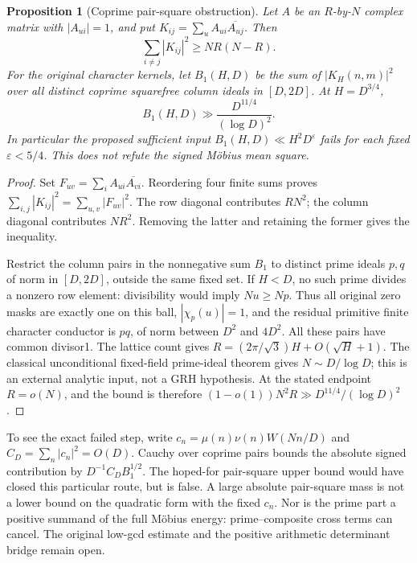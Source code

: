 \documentclass[11pt,oneside,openany]{book}
\newtheorem{proposition}[theorem]{Proposition}
\theoremstyle{definition}\newtheorem{definition}[theorem]{Definition}
\theoremstyle{remark}\newtheorem{remark}[theorem]{Remark}
\begin{document}
\begin{proposition}[Coprime pair-square obstruction]\label{prop:pair-barrier}
Let $A$ be an $R$-by-$N$ complex matrix with $|A_{ui}|=1$, and put
$K_{ij}=\sum_u A_{ui}\overline{A_{uj}}$. Then
\[
 \sum_{i\ne j}|K_{ij}|^2\ge NR(N-R).
\]
For the original character kernels, let $B_1(H,D)$ be the sum of
$|K_H(n,m)|^2$ over all distinct coprime squarefree column ideals in
$[D,2D]$. At $H=D^{3/4}$,
\[
 B_1(H,D)\gg \frac{D^{11/4}}{(\log D)^2}.
\]
In particular the proposed sufficient input
$B_1(H,D)\ll H^2D^\varepsilon$ fails for each fixed $\varepsilon<5/4$.
This does not refute the signed M\"obius mean square.
\end{proposition}
\begin{proof}
Set $F_{uv}=\sum_i A_{ui}\overline{A_{vi}}$. Reordering four finite sums
proves $\sum_{i,j}|K_{ij}|^2=\sum_{u,v}|F_{uv}|^2$.
The row diagonal contributes $RN^2$; the column diagonal contributes
$NR^2$. Removing the latter and retaining the former gives the inequality.

Restrict the column pairs in the nonnegative sum $B_1$ to distinct prime
ideals $p,q$ of norm in $[D,2D]$, outside the same fixed set. If $H<D$,
no such prime divides a nonzero row element: divisibility would imply
$Nu\ge Np$. Thus all original zero masks are exactly one on this ball,
$|\chi_p(u)|=1$, and the residual primitive finite character conductor is
$pq$, of norm between $D^2$ and $4D^2$. All these pairs have common divisor1.
The lattice count gives $R=(2\pi/\sqrt3)H+O(\sqrt H+1)$.
The classical unconditional fixed-field prime-ideal theorem gives
$N\sim D/\log D$; this is an external analytic input, not a GRH hypothesis.
At the stated endpoint $R=o(N)$, and the bound is therefore
$(1-o(1))N^2R\gg D^{11/4}/(\log D)^2$.
\end{proof}

To see the exact failed step, write $c_n=\mu(n)\nu(n)W(Nn/D)$ and
$C_D=\sum_n|c_n|^2=O(D)$. Cauchy over coprime pairs bounds the absolute
signed contribution by $D^{-1}C_DB_1^{1/2}$. The hoped-for pair-square
upper bound would have closed this particular route, but is false.
A large absolute pair-square mass is not a lower bound on the quadratic
form with the fixed $c_n$. Nor is the prime part a positive summand of the
full M\"obius energy: prime--composite cross terms can cancel. The original
low-gcd estimate and the positive arithmetic determinant bridge remain open.
\end{document}

